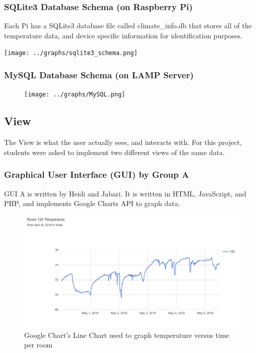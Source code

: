 \documentclass{article}
\begin{document}
			\subsubsection{SQLite3 Database Schema (on Raspberry Pi)}	
				Each Pi has a SQLite3 database file called climate\_info.db that stores all of the temperature data, and device specific information
				for identification purposes.
				
				\begin{center}
					\texttt{[image: ../graphs/sqlite3\_schema.png]}
				\end{center}
			
			\subsubsection{MySQL Database Schema (on LAMP Server)}
				\begin{figure}[H]
					\begin{center}
						\texttt{[image: ../graphs/MySQL.png]}
					\end{center}	
				\end{figure}
			
		\subsection{View}
			The View is what the user actually sees, and interacts with. 
			For this project, students were asked to implement two different views of the same data.		
		
			\subsubsection{Graphical User Interface (GUI) by Group A}
				GUI A is written by Heidi and Jabari. It is written in HTML, JavaScript, and PHP, and implements Google Charts API to graph data.
				
				\begin{figure}[H]
					\begin{center}
						\includegraphics[scale=.4]{TempVersusTime.PNG}			
					\end{center}
					\captionsetup{labelformat=empty}
					\caption{Google Chart's Line Chart used to graph temperature versus time per room}
				\end{figure}				
				
\end{document}
